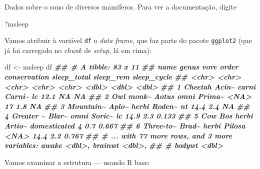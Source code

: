 \documentclass[
  11pt]{report}
\newenvironment{Shaded}{\begin{snugshade}}{\end{snugshade}}
\newcommand{\DocumentationTok}[1]{\textcolor[rgb]{0.56,0.35,0.01}{\textbf{\textit{#1}}}}
\newcommand{\NormalTok}[1]{#1}
\newcommand{\OtherTok}[1]{\textcolor[rgb]{0.56,0.35,0.01}{#1}}
\begin{document}
Dados sobre o sono de diversos mamíferos. Para ver a documentação, digite

\begin{Shaded}
\begin{Highlighting}[]
\NormalTok{?msleep}
\end{Highlighting}
\end{Shaded}

Vamos atribuir à variável \texttt{df} o \emph{data frame}, que faz parte do pacote \texttt{ggplot2} (que já foi carregado no \emph{chunk} de \emph{setup}, lá em cima):

\begin{Shaded}
\begin{Highlighting}[]
\NormalTok{df }\OtherTok{\textless{}{-}}\NormalTok{ msleep}
\NormalTok{df}
\DocumentationTok{\#\# \# A tibble: 83 x 11}
\DocumentationTok{\#\#   name      genus vore  order  conservation sleep\_total sleep\_rem sleep\_cycle}
\DocumentationTok{\#\#   \textless{}chr\textgreater{}     \textless{}chr\textgreater{} \textless{}chr\textgreater{} \textless{}chr\textgreater{}  \textless{}chr\textgreater{}              \textless{}dbl\textgreater{}     \textless{}dbl\textgreater{}       \textless{}dbl\textgreater{}}
\DocumentationTok{\#\# 1 Cheetah   Acin\textasciitilde{} carni Carni\textasciitilde{} lc                  12.1      NA        NA    }
\DocumentationTok{\#\# 2 Owl monk\textasciitilde{} Aotus omni  Prima\textasciitilde{} \textless{}NA\textgreater{}                17         1.8      NA    }
\DocumentationTok{\#\# 3 Mountain\textasciitilde{} Aplo\textasciitilde{} herbi Roden\textasciitilde{} nt                  14.4       2.4      NA    }
\DocumentationTok{\#\# 4 Greater \textasciitilde{} Blar\textasciitilde{} omni  Soric\textasciitilde{} lc                  14.9       2.3       0.133}
\DocumentationTok{\#\# 5 Cow       Bos   herbi Artio\textasciitilde{} domesticated         4         0.7       0.667}
\DocumentationTok{\#\# 6 Three{-}to\textasciitilde{} Brad\textasciitilde{} herbi Pilosa \textless{}NA\textgreater{}                14.4       2.2       0.767}
\DocumentationTok{\#\# \# ... with 77 more rows, and 3 more variables: awake \textless{}dbl\textgreater{}, brainwt \textless{}dbl\textgreater{},}
\DocumentationTok{\#\# \#   bodywt \textless{}dbl\textgreater{}}
\end{Highlighting}
\end{Shaded}

Vamos examinar a estrutura --- usando R base:
\end{document}

